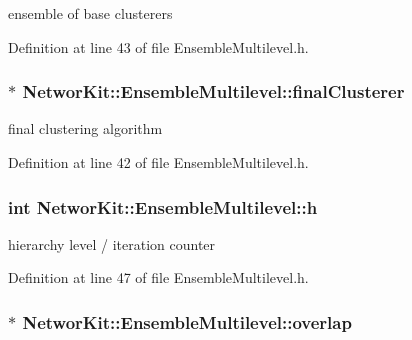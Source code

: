 ensemble of base clusterers 



Definition at line 43 of file Ensemble\-Multilevel.\-h.

\hypertarget{class_networ_kit_1_1_ensemble_multilevel_a7a6938877c0d0f405b953eda8053c181}{
\subsubsection[{final\-Clusterer}]{$\ast$ Networ\-Kit\-::\-Ensemble\-Multilevel\-::final\-Clusterer\hspace{0.3cm}{\ttfamily [protected]}}}\label{class_networ_kit_1_1_ensemble_multilevel_a7a6938877c0d0f405b953eda8053c181}


final clustering algorithm 



Definition at line 42 of file Ensemble\-Multilevel.\-h.

\hypertarget{class_networ_kit_1_1_ensemble_multilevel_a4bc6df355537771fcdc186b308232391}{
\subsubsection[{h}]{\setlength{\rightskip}{0pt plus 5cm}int Networ\-Kit\-::\-Ensemble\-Multilevel\-::h\hspace{0.3cm}{\ttfamily [protected]}}}\label{class_networ_kit_1_1_ensemble_multilevel_a4bc6df355537771fcdc186b308232391}


hierarchy level / iteration counter 



Definition at line 47 of file Ensemble\-Multilevel.\-h.

\hypertarget{class_networ_kit_1_1_ensemble_multilevel_a4b3abd511fb680656839a9fc9b02c5db}{
\subsubsection[{overlap}]{$\ast$ Networ\-Kit\-::\-Ensemble\-Multilevel\-::overlap\hspace{0.3cm}{\ttfamily [protected]}}}\label{class_networ_kit_1_1_ensemble_multilevel_a4b3abd511fb680656839a9fc9b02c5db}


